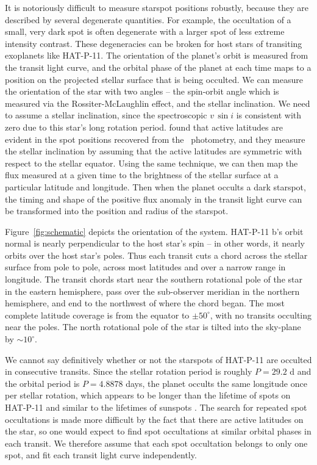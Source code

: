 It is notoriously difficult to measure starspot positions robustly, because they are described by several degenerate quantities. For example, the occultation of a small, very dark spot is often degenerate with a larger spot of less extreme intensity contrast. These degeneracies can be broken for host stars of transiting exoplanets like HAT-P-11. The orientation of the planet's orbit is measured from the transit light curve, and the orbital phase of the planet at each time maps to a position on the projected stellar surface that is being occulted. We can measure the orientation of the star with two angles -- the spin-orbit angle which is measured via the Rossiter-McLaughlin effect, and the stellar inclination. We need to assume a stellar inclination, since the spectroscopic $v\,\sin{i}$ is consistent with zero \citep{bakos2010} due to this star's long rotation period. \citet{Sanchis-Ojeda2011} found that active latitudes are evident in the spot positions recovered from the \kepler\ photometry, and they measure the stellar inclination by assuming that the active latitudes are symmetric with respect to the stellar equator. Using the same technique, we can then map the flux measured at a given time to the brightness of the stellar surface at a particular latitude and longitude. Then when the planet occults a dark starspot, the timing and shape of the positive flux anomaly in the transit light curve can be transformed into the position and radius of the starspot. 

Figure~\ref{fig:schematic} depicts the orientation of the system. HAT-P-11 b's orbit normal is nearly perpendicular to the host star's spin -- in other words, it nearly orbits over the host star's poles. Thus each transit cuts a chord across the stellar surface from pole to pole, across most latitudes and over a narrow range in longitude. The transit chords start near the southern rotational pole of the star in the eastern hemisphere, pass over the sub-observer meridian in the northern hemisphere, and end to the northwest of where the chord began. The most complete latitude coverage is from the equator to $\pm 50^\circ$, with no transits occulting near the poles. The north rotational pole of the star is tilted into the sky-plane by $\sim10^\circ$.

We cannot say definitively whether or not the starspots of HAT-P-11 are occulted in consecutive transits. Since the stellar rotation period is roughly $P=29.2$ d and the orbital period is $P = 4.8878$ days, the planet occults the same longitude once per stellar rotation, which appears to be longer than the lifetime of spots on HAT-P-11 \citep{Sanchis-Ojeda2011} and similar to the lifetimes of sunspots \citep{Solanki2003}. The search for repeated spot occultations is made more difficult by the fact that there are active latitudes on the star, so one would expect to find spot occultations at similar orbital phases in each transit. We therefore assume that each spot occultation belongs to only one spot, and fit each transit light curve independently.

